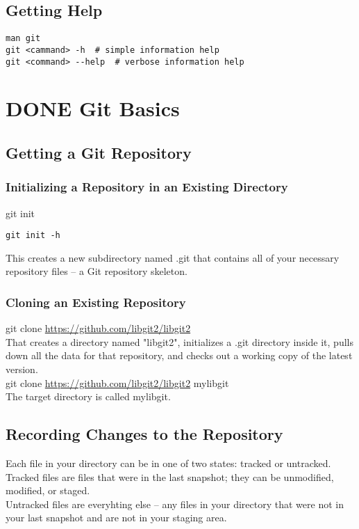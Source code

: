 \documentclass[11pt]{article}
\begin{document}
\subsection{Getting Help}
\label{sec:orgd6fa561}
\begin{verbatim}
man git
git <cammand> -h  # simple information help
git <command> --help  # verbose information help
\end{verbatim}



\section{{\bfseries\sffamily DONE} Git Basics}
\label{sec:org53bc411}
\subsection{Getting a Git Repository}
\label{sec:orge38dcba}
\subsubsection{Initializing a Repository in an Existing Directory}
\label{sec:orga3ef533}
git init

\begin{verbatim}
git init -h
\end{verbatim}

This creates a new subdirectory named .git that contains all of your necessary repository files -- a Git repository skeleton.\\

\subsubsection{Cloning an Existing Repository}
\label{sec:org407443e}
git clone \url{https://github.com/libgit2/libgit2}\\

That creates a directory named "libgit2", initializes a .git directory inside it, pulls down all the data for that repository, and checks out a working copy of the latest version.\\

git clone \url{https://github.com/libgit2/libgit2} mylibgit\\

The target directory is called mylibgit.\\

\subsection{Recording Changes to the Repository}
\label{sec:orgae728fd}
Each file in your directory can be in one of two states: tracked or untracked.\\
Tracked files are files that were in the last snapshot; they can be unmodified, modified, or staged.\\
Untracked files are everyhting else -- any files in your directory that were not in your last snapshot and are not in your staging area.\\
\end{document}
